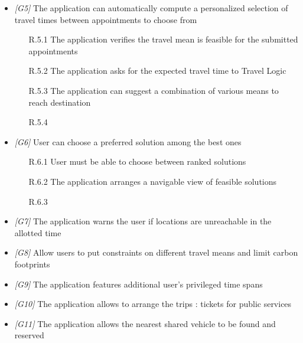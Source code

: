 \begin{itemize}
\begin{itemize}
                 \end{itemize}

\item \textit{[G5]} The application can automatically compute a personalized selection of travel times between appointments to choose from

                  \begin{itemize}
                        \item [R.5.1] The application verifies the travel mean is feasible for the submitted appointments
                        \item [R.5.2] The application asks for the expected travel time to Travel Logic
                        \item [R.5.3] The application can suggest a combination of various means to reach destination
                        \item [R.5.4] 
                        
                  \end{itemize}
                  
\item \textit{[G6]} User can choose a preferred solution among the best ones 

                   \begin{itemize}
                        \item [R.6.1] User must be able to choose between ranked solutions
                        \item [R.6.2] The application arranges a navigable view of feasible solutions
                        \item [R.6.3] 
                  \end{itemize}
                  
\item \textit{[G7]} The application warns the user if locations are unreachable in the allotted time 

\item \textit{[G8]} Allow users to put constraints on different travel means and limit carbon footprints

\item \textit{[G9]} The application features additional user’s privileged time spans 

\item \textit{[G10]} The application allows to arrange the trips : tickets for public services

\item \textit{[G11]} The application allows the nearest shared vehicle to be found and reserved


\end{itemize}
